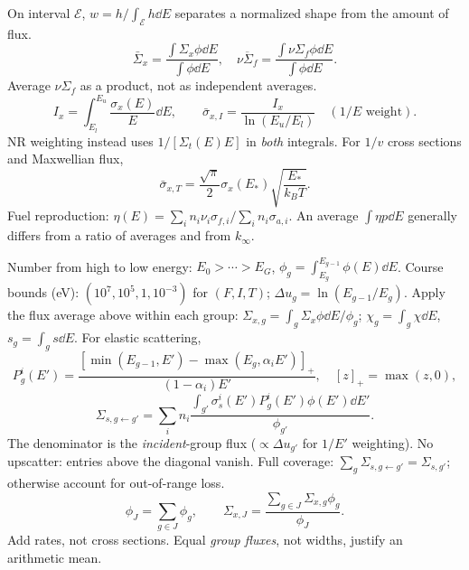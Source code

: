 \begin{handoutcolumns}
\switchcolumn\RaggedRight
On interval $\mathcal E$, $w=h/\int_{\mathcal E}h\dd E$ separates a
normalized shape from the amount of flux.
\[
 \bar\Sigma_x=\frac{\int\Sigma_x\phi\dd E}{\int\phi\dd E},\quad
 \overline{\nu\Sigma_f}=\frac{\int\nu\Sigma_f\phi\dd E}{\int\phi\dd E}.
\]
Average $\nu\Sigma_f$ as a product, not as independent averages.
\[
 I_x=\int_{E_l}^{E_u}\frac{\sigma_x(E)}{E}\dd E,\qquad
 \bar\sigma_{x,I}=\frac{I_x}{\ln(E_u/E_l)}\quad(1/E\text{ weight}).
\]
NR weighting instead uses $1/[\Sigma_t(E)E]$ in \emph{both} integrals.
For $1/v$ cross sections and Maxwellian flux,
\[
 \bar\sigma_{x,T}=\frac{\sqrt\pi}{2}\sigma_x(E_*)
 \sqrt{\frac{E_*}{k_BT}}.
\]
Fuel reproduction: $\eta(E)=\sum_i n_i\nu_i\sigma_{f,i}/
\sum_i n_i\sigma_{a,i}$. An average $\int\eta p\dd E$ generally differs
from a ratio of averages and from $k_\infty$.

Number from high to low energy: $E_0>\cdots>E_G$,
$\phi_g=\int_{E_g}^{E_{g-1}}\phi(E)\dd E$.
Course bounds (eV): $(10^7,10^5,1,10^{-3})$ for $(F,I,T)$;
$\Delta u_g=\ln(E_{g-1}/E_g)$.
Apply the flux average above within each group:
$\Sigma_{x,g}=\int_g\Sigma_x\phi\dd E/\phi_g$;
$\chi_g=\int_g\chi\dd E$, $s_g=\int_gs\dd E$.
 For elastic scattering,
\[
 P_g^i(E')=\frac{[\min(E_{g-1},E')-\max(E_g,\alpha_i E')]_+}
                  {(1-\alpha_i)E'},\quad[z]_+=\max(z,0),
\]
\[
 \Sigma_{s,g\gets g'}=\sum_i n_i
 \frac{\int_{g'}\sigma_s^i(E')P_g^i(E')\phi(E')\dd E'}{\phi_{g'}}.
\]
The denominator is the \emph{incident}-group flux ($\propto\Delta u_{g'}$
for $1/E'$ weighting). No upscatter: entries above the diagonal vanish.
Full coverage: $\sum_g\Sigma_{s,g\gets g'}=\Sigma_{s,g'}$; otherwise
account for out-of-range loss.
\[
 \phi_J=\sum_{g\in J}\phi_g,\qquad
 \Sigma_{x,J}=\frac{\sum_{g\in J}\Sigma_{x,g}\phi_g}{\phi_J}.
\]
Add rates, not cross sections. Equal \emph{group fluxes}, not widths,
justify an arithmetic mean.


\end{handoutcolumns}

